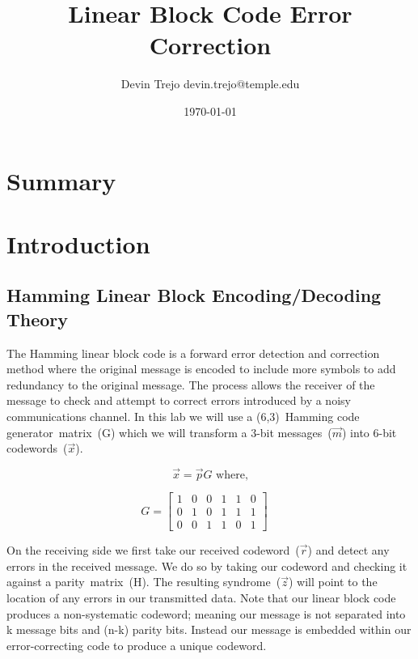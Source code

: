 \documentclass[12pt]{article}
\begin{document}
\title{Linear Block Code Error Correction}
\author{Devin Trejo \tabularnewline devin.trejo@temple.edu }
\date{\today}
\maketitle

\section{Summary}
\label{sect:summary}


\section{Introduction}
\label{sect:intro}
\subsection{Hamming Linear Block Encoding/Decoding Theory}
\label{sec:theory}
The Hamming linear block code is a forward error detection and correction 
method where the original message is encoded to include more symbols to 
add redundancy to the original message. The process allows the receiver of
the message to check and attempt to correct errors introduced by a 
noisy communications channel. In this lab we will use a (6,3)~Hamming code
generator~matrix~(G) which we will transform a 3-bit messages~($\vec{m}$) 
into 6-bit codewords~($\vec{x}$).

\begin{equation}
    \vec{x}=\vec{p}G \text{ where,}
    \label{eq:encoder}
\end{equation}

$$
    G=
    \begin{bmatrix}
        1 & 0 & 0 & 1 & 1 & 0 \\
        0 & 1 & 0 & 1 & 1 & 1 \\
        0 & 0 & 1 & 1 & 0 & 1
    \end{bmatrix} \quad
$$

On the receiving side we first take our received codeword~($\vec{r}$) and 
detect any errors in the received message. We do so by taking our 
codeword and checking it against a parity~matrix~(H). The resulting 
syndrome~($\vec{z}$) will point to the location of any errors in our 
transmitted data. Note that our linear block code produces a 
non-systematic codeword; meaning our message is not separated into k message
bits and (n-k) parity bits. \cite{Balakrishnan2010} Instead our message is 
embedded within our error-correcting code to produce a unique codeword. 
\end{document}
